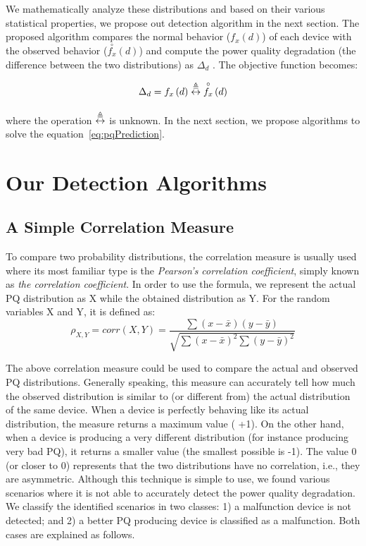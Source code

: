 We mathematically analyze these distributions and based on their various statistical properties, we propose out detection algorithm in the next section. The proposed algorithm compares the normal behavior ($f_x\left(d\right)$) of each device with the observed behavior ($\overset{\circ}{f_x}\left(d\right)$) and compute the power quality degradation (the difference between the two distributions) as $\Delta_d$ . The objective function becomes:

\begin{equation}
\label{eq:pqPrediction}
\Delta_d = f_x\left(d\right) \mathrel{\overset\triangleq\leftrightarrow} \overset{\circ}{f_x}\left(d\right)
\end{equation}

\noindent where the operation $\mathrel{\overset\triangleq\leftrightarrow}$ is unknown. In the next section,  we propose algorithms to solve the equation~\ref{eq:pqPrediction}.

\section{Our Detection Algorithms}
\subsection{A Simple Correlation Measure}
To compare two probability distributions, the correlation measure is usually used where its most familiar type is the \textit{Pearson's correlation coefficient}, simply known as \textit{the correlation coefficient}. In order to use the formula, we represent the actual PQ distribution as X while the obtained distribution as Y. For the random variables X and Y, it is defined as:
\[\rho_{X,Y} = corr(X,Y) = \frac{\sum (x-\bar x) (y-\bar y)}{\sqrt{\sum (x-\bar x)^2 \sum (y-\bar y)^2}}\]

The above correlation measure could be used to compare the actual and observed PQ distributions. Generally speaking, this measure can accurately tell how much the observed distribution is similar to (or different from) the actual distribution of the same device. When a device is perfectly behaving like its actual distribution, the measure returns a maximum value (  +1). On the other hand, when a device is producing a very different distribution (for instance producing very bad PQ), it returns a smaller value (the smallest possible is -1). The value 0 (or closer to 0) represents that the two distributions have no correlation, i.e., they are asymmetric. Although this technique is simple to use, we found various scenarios where it is not able to accurately detect the power quality degradation. We classify the identified scenarios in two classes: 1) a malfunction device is not detected; and 2) a better PQ producing device is classified as a malfunction. Both cases are explained as follows.

